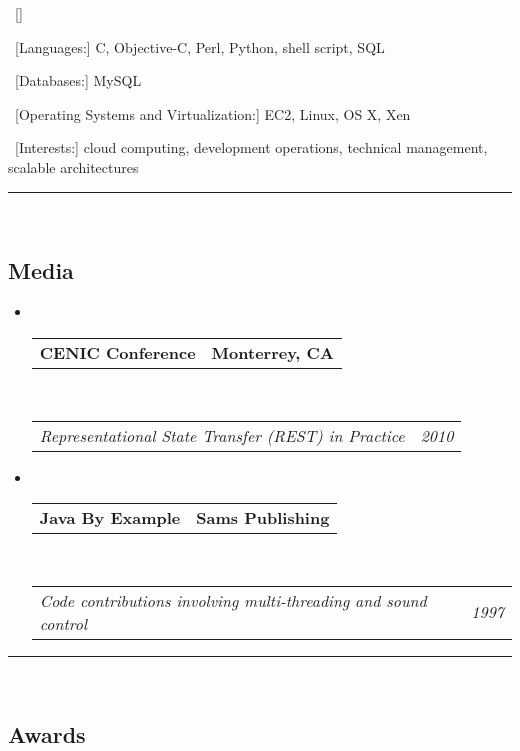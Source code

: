 \documentclass[10pt,letterpaper]{article}
\makeatletter
\newenvironment{indentsection}[1]%
{\begin{list}{}%
	{\setlength{\leftmargin}{#1}}%
	\item\ []%
}
{\end{list}}
\newcommand{\headerrow}[2]
{\begin{tabular*}{\linewidth}{l@{\extracolsep{\fill}}r}
	#1 &
	#2 \\
\end{tabular*}}
\makeatother
\begin{document}
\begin{indentsection}{\parindent}
\begin{description*}
	\item\ [Languages:]
	C, Objective-C, Perl, Python, shell script, SQL
	\item\ [Databases:]
	MySQL
	\item\ [Operating Systems and Virtualization:]
	EC2, Linux, OS X, Xen
	\item\ [Interests:]
	cloud computing, development operations, technical management, scalable architectures	
\end{description*}
\end{indentsection}

\hrule\
\vspace{-0.4em}
\subsection*{Media}

\begin{itemize}
	\parskip=0.1em

	\item\ 
	\headerrow
		{\textbf{CENIC Conference}}
		{\textbf{Monterrey, CA}}
	\\
	\headerrow
		{\emph{Representational State Transfer (REST) in Practice}}
		{\emph{2010}}
		
	\item\ 
	\headerrow
		{\textbf{Java By Example}}
		{\textbf{Sams Publishing}}
	\\
	\headerrow
		{\emph{Code contributions involving multi-threading and sound control}}
		{\emph{1997}}
\end{itemize}


\hrule\
\vspace{-0.4em}
\subsection*{Awards}
\end{document}
